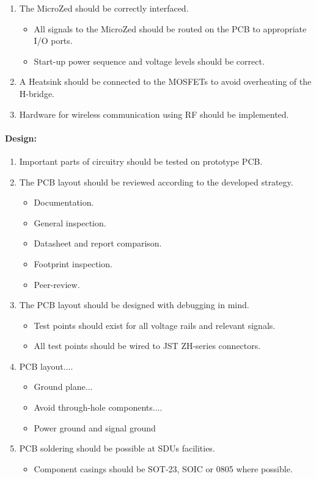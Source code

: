 \begin{enumerate}[resume]
	\item The MicroZed should be correctly interfaced.
	\label{enum:microzed_interface}
	\begin{itemize}
		\item All signals to the MicroZed should be routed on the PCB to appropriate I/O ports.
		\item Start-up power sequence and voltage levels should be correct.
	\end{itemize}
	\item A Heatsink should be connected to the MOSFETs to avoid overheating of the H-bridge.
	\label{enum:cool_mosfets}
	\item Hardware for wireless communication using RF should be implemented.
	\label{enum:hardware_for_wireless_implemented}
\end{enumerate}


\paragraph{Design:}
\begin{enumerate}[resume]
	\item Important parts of circuitry should be tested on prototype PCB.
	\label{enum:important_prototype}
	\item The PCB layout should be reviewed according to the developed strategy.
	\label{enum:pcb_strategy}
	\begin{itemize}
		\item Documentation.
		\item General inspection.
		\item Datasheet and report comparison.
		\item Footprint inspection.
		\item Peer-review.
	\end{itemize}
	\item The PCB layout should be designed with debugging in mind.
	\label{enum:pcb_debugging}
	\begin{itemize}
		\item Test points should exist for all voltage rails and relevant signals.
		\item All test points should be wired to JST ZH-series connectors.
	\end{itemize}
	\item PCB layout....
	\label{enum:pcb_layout}
	\begin{itemize}
		\item Ground plane...
		\item Avoid through-hole components....
		\item Power ground and signal ground
	\end{itemize}
	\item PCB soldering should be possible at SDUs facilities.
	\label{enum:pcb_soldering}
	\begin{itemize}
		\item Component casings should be SOT-23, SOIC or 0805 where possible.
	\end{itemize}
\end{enumerate}

